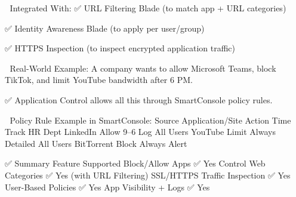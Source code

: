 🔐 Integrated With:
✅ URL Filtering Blade (to match app + URL categories)

✅ Identity Awareness Blade (to apply per user/group)

✅ HTTPS Inspection (to inspect encrypted application traffic)

📘 Real-World Example:
A company wants to allow Microsoft Teams, block TikTok, and limit YouTube bandwidth after 6 PM.

✅ Application Control allows all this through SmartConsole policy rules.

🧰 Policy Rule Example in SmartConsole:
Source	Application/Site	Action	Time	Track
HR Dept	LinkedIn	Allow	9–6	Log
All Users	YouTube	Limit	Always	Detailed
All Users	BitTorrent	Block	Always	Alert

✅ Summary
Feature	Supported
Block/Allow Apps	✅ Yes
Control Web Categories	✅ Yes (with URL Filtering)
SSL/HTTPS Traffic Inspection	✅ Yes
User-Based Policies	✅ Yes
App Visibility + Logs	✅ Yes



